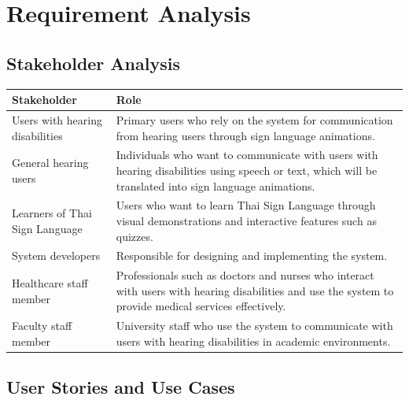 \chapter{Requirement Analysis}
\label{chap:requirement-analysis}

\section{Stakeholder Analysis}
\label{section:stakeholder-analysis}
\begin{table}[h]
\centering
\renewcommand{\arraystretch}{1.5}
\begin{tabular}{|l|p{10cm}|}
\hline
\textbf{Stakeholder} & \textbf{Role} \\ \hline
Users with hearing disabilities  & Primary users who rely on the system for communication from hearing users through sign language animations. \\ \hline
General hearing users & Individuals who want to communicate with users with hearing disabilities using speech or text, which will be translated into sign language animations. \\ \hline
Learners of Thai Sign Language & Users who want to learn Thai Sign Language through visual demonstrations and interactive features such as quizzes. \\ \hline
System developers & Responsible for designing and implementing the system. \\ \hline
Healthcare staff member & Professionals such as doctors and nurses who interact with users with hearing disabilities and use the system to provide medical services effectively. \\ \hline
Faculty staff member & University staff who use the system to communicate with users with hearing disabilities in academic environments.  \\ \hline
\end{tabular}
\end{table}


\section{User Stories and Use Cases}
\label{section:user-stories-use-cases}

